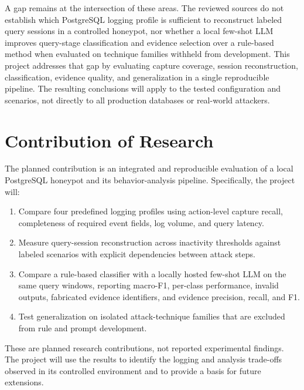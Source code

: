 \documentclass[12pt,a4paper]{report}
\begin{document}
A gap remains at the intersection of these areas. The reviewed sources do not establish which PostgreSQL logging profile is sufficient to reconstruct labeled query sessions in a controlled honeypot, nor whether a local few-shot LLM improves query-stage classification and evidence selection over a rule-based method when evaluated on technique families withheld from development. This project addresses that gap by evaluating capture coverage, session reconstruction, classification, evidence quality, and generalization in a single reproducible pipeline. The resulting conclusions will apply to the tested configuration and scenarios, not directly to all production databases or real-world attackers.

\section{Contribution of Research}
The planned contribution is an integrated and reproducible evaluation of a local PostgreSQL honeypot and its behavior-analysis pipeline. Specifically, the project will:
\begin{enumerate}[label=\textbf{C\arabic*:}]
    \item Compare four predefined logging profiles using action-level capture recall, completeness of required event fields, log volume, and query latency.
    \item Measure query-session reconstruction across inactivity thresholds against labeled scenarios with explicit dependencies between attack steps.
    \item Compare a rule-based classifier with a locally hosted few-shot LLM on the same query windows, reporting macro-F1, per-class performance, invalid outputs, fabricated evidence identifiers, and evidence precision, recall, and F1.
    \item Test generalization on isolated attack-technique families that are excluded from rule and prompt development.
\end{enumerate}
These are planned research contributions, not reported experimental findings. The project will use the results to identify the logging and analysis trade-offs observed in its controlled environment and to provide a basis for future extensions.

%   
\end{document}
